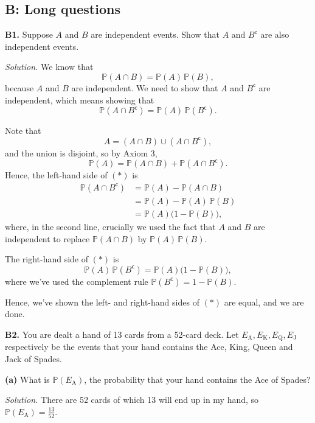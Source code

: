 \documentclass[
  a4paper,
]{book}
\theoremstyle{definition}
\theoremstyle{definition}
\theoremstyle{definition}
\theoremstyle{definition}
\theoremstyle{remark}
\begin{document}
\hypertarget{P3-long-solutions}{%
\subsection*{B: Long questions}\label{P3-long-solutions}}

\textbf{B1.} Suppose \(A\) and \(B\) are independent events. Show that \(A\) and \(B^\mathsf{c}\) are also independent events.

\begin{myanswers}
\emph{Solution.} We know that
\[ \mathbb P(A \cap B) = \mathbb P(A) \, \mathbb P(B) , \]
because \(A\) and \(B\) are independent.
We need to show that \(A\) and \(B^\mathsf{c}\) are independent, which means showing that
\[ \mathbb P(A \cap B^\mathsf{c}) = \mathbb P(A) \, \mathbb P(B^\mathsf{c}) . \tag{$*$} \]

Note that
\[ A = (A \cap B) \cup (A \cap B^\mathsf{c}) , \]
and the union is disjoint, so by Axiom 3,
\[ \mathbb P(A) = \mathbb P(A \cap B) + \mathbb P(A \cap B^\mathsf{c}) . \]
Hence, the left-hand side of \((*)\) is
\begin{align*}
\mathbb P(A \cap B^\mathsf{c})
&= \mathbb P(A) - \mathbb P(A \cap B) \\
&= \mathbb P(A) - \mathbb P(A)\,\mathbb P(B) \\
&= \mathbb P(A) \big(1 - \mathbb P(B)\big) ,
\end{align*}
where, in the second line, crucially we used the fact that \(A\) and \(B\) are independent to replace \(\mathbb P(A \cap B)\) by \(\mathbb P(A)\,\mathbb P(B)\).

The right-hand side of \((*)\) is
\[\mathbb P(A) \, \mathbb P(B^\mathsf{c}) = \mathbb P(A) \big(1 - \mathbb P(B)\big) , \]
where we've used the complement rule \(\mathbb P(B^\mathsf{c}) = 1- \mathbb P(B)\).

Hence, we've shown the left- and right-hand sides of \((*)\) are equal, and we are done.

\end{myanswers}

\textbf{B2.} You are dealt a hand of 13 cards from a 52-card deck. Let \(E_\mathrm{A}, E_\mathrm{K}, E_\mathrm{Q}, E_\mathrm{J}\) respectively be the events that your hand contains the Ace, King, Queen and Jack of Spades.

\textbf{(a)} What is \(\mathbb P(E_\mathrm{A})\), the probability that your hand contains the Ace of Spades?

\begin{myanswers}
\emph{Solution.} There are 52 cards of which 13 will end up in my hand, so \(\mathbb P(E_\mathrm{A}) = \frac{13}{52}\).

\end{myanswers}
\end{document}
